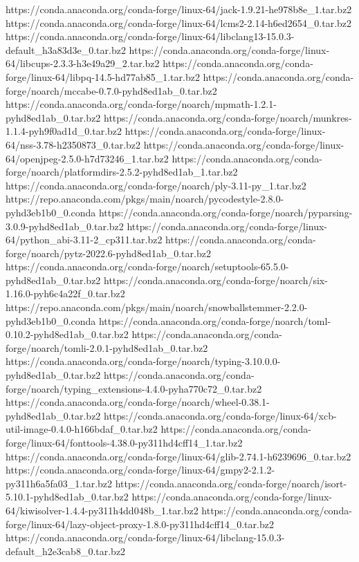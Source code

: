 https://conda.anaconda.org/conda-forge/linux-64/jack-1.9.21-he978b8e_1.tar.bz2
https://conda.anaconda.org/conda-forge/linux-64/lcms2-2.14-h6ed2654_0.tar.bz2
https://conda.anaconda.org/conda-forge/linux-64/libclang13-15.0.3-default_h3a83d3e_0.tar.bz2
https://conda.anaconda.org/conda-forge/linux-64/libcups-2.3.3-h3e49a29_2.tar.bz2
https://conda.anaconda.org/conda-forge/linux-64/libpq-14.5-hd77ab85_1.tar.bz2
https://conda.anaconda.org/conda-forge/noarch/mccabe-0.7.0-pyhd8ed1ab_0.tar.bz2
https://conda.anaconda.org/conda-forge/noarch/mpmath-1.2.1-pyhd8ed1ab_0.tar.bz2
https://conda.anaconda.org/conda-forge/noarch/munkres-1.1.4-pyh9f0ad1d_0.tar.bz2
https://conda.anaconda.org/conda-forge/linux-64/nss-3.78-h2350873_0.tar.bz2
https://conda.anaconda.org/conda-forge/linux-64/openjpeg-2.5.0-h7d73246_1.tar.bz2
https://conda.anaconda.org/conda-forge/noarch/platformdirs-2.5.2-pyhd8ed1ab_1.tar.bz2
https://conda.anaconda.org/conda-forge/noarch/ply-3.11-py_1.tar.bz2
https://repo.anaconda.com/pkgs/main/noarch/pycodestyle-2.8.0-pyhd3eb1b0_0.conda
https://conda.anaconda.org/conda-forge/noarch/pyparsing-3.0.9-pyhd8ed1ab_0.tar.bz2
https://conda.anaconda.org/conda-forge/linux-64/python_abi-3.11-2_cp311.tar.bz2
https://conda.anaconda.org/conda-forge/noarch/pytz-2022.6-pyhd8ed1ab_0.tar.bz2
https://conda.anaconda.org/conda-forge/noarch/setuptools-65.5.0-pyhd8ed1ab_0.tar.bz2
https://conda.anaconda.org/conda-forge/noarch/six-1.16.0-pyh6c4a22f_0.tar.bz2
https://repo.anaconda.com/pkgs/main/noarch/snowballstemmer-2.2.0-pyhd3eb1b0_0.conda
https://conda.anaconda.org/conda-forge/noarch/toml-0.10.2-pyhd8ed1ab_0.tar.bz2
https://conda.anaconda.org/conda-forge/noarch/tomli-2.0.1-pyhd8ed1ab_0.tar.bz2
https://conda.anaconda.org/conda-forge/noarch/typing-3.10.0.0-pyhd8ed1ab_0.tar.bz2
https://conda.anaconda.org/conda-forge/noarch/typing_extensions-4.4.0-pyha770c72_0.tar.bz2
https://conda.anaconda.org/conda-forge/noarch/wheel-0.38.1-pyhd8ed1ab_0.tar.bz2
https://conda.anaconda.org/conda-forge/linux-64/xcb-util-image-0.4.0-h166bdaf_0.tar.bz2
https://conda.anaconda.org/conda-forge/linux-64/fonttools-4.38.0-py311hd4cff14_1.tar.bz2
https://conda.anaconda.org/conda-forge/linux-64/glib-2.74.1-h6239696_0.tar.bz2
https://conda.anaconda.org/conda-forge/linux-64/gmpy2-2.1.2-py311h6a5fa03_1.tar.bz2
https://conda.anaconda.org/conda-forge/noarch/isort-5.10.1-pyhd8ed1ab_0.tar.bz2
https://conda.anaconda.org/conda-forge/linux-64/kiwisolver-1.4.4-py311h4dd048b_1.tar.bz2
https://conda.anaconda.org/conda-forge/linux-64/lazy-object-proxy-1.8.0-py311hd4cff14_0.tar.bz2
https://conda.anaconda.org/conda-forge/linux-64/libclang-15.0.3-default_h2e3cab8_0.tar.bz2
